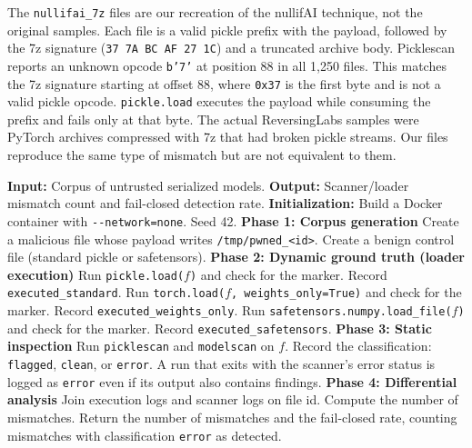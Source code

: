 \documentclass[conference]{IEEEtran}
\begin{document}
The \texttt{nullifai\_7z} files are our recreation of the nullifAI technique, not the original samples. Each file is a valid pickle prefix with the payload, followed by the 7z signature (\texttt{37 7A BC AF 27 1C}) and a truncated archive body. Picklescan reports an unknown opcode \texttt{b'7'} at position 88 in all 1,250 files. This matches the 7z signature starting at offset 88, where \texttt{0x37} is the first byte and is not a valid pickle opcode. \texttt{pickle.load} executes the payload while consuming the prefix and fails only at that byte. The actual ReversingLabs samples were PyTorch archives compressed with 7z that had broken pickle streams. Our files reproduce the same type of mismatch but are not equivalent to them.

\begin{algorithm}[htbp]
\caption{Isolated Differential Execution Algorithm (IDEF)}
\label{alg:harness}
\begin{algorithmic}[1]
\State \textbf{Input:} Corpus of untrusted serialized models.
\State \textbf{Output:} Scanner/loader mismatch count and fail-closed detection rate.
\State \textbf{Initialization:} Build a Docker container with \texttt{-{}-network=none}. Seed 42.
\State \textbf{Phase 1: Corpus generation}
\State Create a malicious file whose payload writes \texttt{/tmp/pwned\_<id>}.
\EndFor
{}
\State Create a benign control file (standard pickle or safetensors).
\EndFor
\State \textbf{Phase 2: Dynamic ground truth (loader execution)}
\State Run \texttt{pickle.load($f$)} and check for the marker. Record \texttt{executed\_standard}.
\State Run \texttt{torch.load($f$, weights\_only=True)} and check for the marker. Record \texttt{executed\_weights\_only}.
\State Run \texttt{safetensors.numpy.load\_file($f$)} and check for the marker. Record \texttt{executed\_safetensors}.
\EndFor
\State \textbf{Phase 3: Static inspection}
\State Run \texttt{picklescan} and \texttt{modelscan} on $f$.
\State Record the classification: \texttt{flagged}, \texttt{clean}, or \texttt{error}. A run that exits with the scanner's error status is logged as \texttt{error} even if its output also contains findings.
\EndFor
\State \textbf{Phase 4: Differential analysis}
\State Join execution logs and scanner logs on file id.
\State Compute the number of mismatches.
\State Return the number of mismatches and the fail-closed rate, counting mismatches with classification \texttt{error} as detected.
\end{algorithmic}
\end{algorithm}
\end{document}
